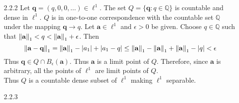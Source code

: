 \documentclass[../../Solutions.tex]{subfiles}
\begin{document}
\begin{itemize}
	\item [2.2.2] Let $\mathbf{q} = (q,0,0,\dots) \in \ell^1$.
		The set $Q = \{\mathbf{q} : q \in \mathbb{Q} \}$ is countable and dense in $\ell^1$.
		$Q$ is in one-to-one correspondence with the countable set $\mathbb{Q}$ under the mapping $\mathbf{q} \to q$.
		Let $\mathbf{a} \in \ell^1$ and $\epsilon > 0$ be given.
		Choose $q \in \mathbb{Q}$ such that $\left\lVert\mathbf{a}\right\rVert_1 < q < \left\lVert\mathbf{a}\right\rVert_1 + \epsilon$.
		Then
		$$\left\lVert\mathbf{a}-\mathbf{q}\right\rVert_1 = \left\lVert\mathbf{a}\right\rVert_1-|a_1|+|a_1-q| \leq \left\lVert\mathbf{a}\right\rVert_1 - \left\lVert\mathbf{a}\right\rVert_1 + \left\lVert\mathbf{a}\right\rVert_1 - |q| < \epsilon$$
		Thus $\mathbf{q} \in Q \cap B_\epsilon(\mathbf{a})$.
		Thus $\mathbf{a}$ is a limit point of $Q$.
		Therefore, since $\mathbf{a}$ is arbitrary, all the points of $\ell^1$ are limit points of $Q$. \\
		Thus $Q$ is a countable dense subset of $\ell^1$ making $\ell^1$ separable.
	
	\item [2.2.3] 
	
\end{itemize}
\end{document}
